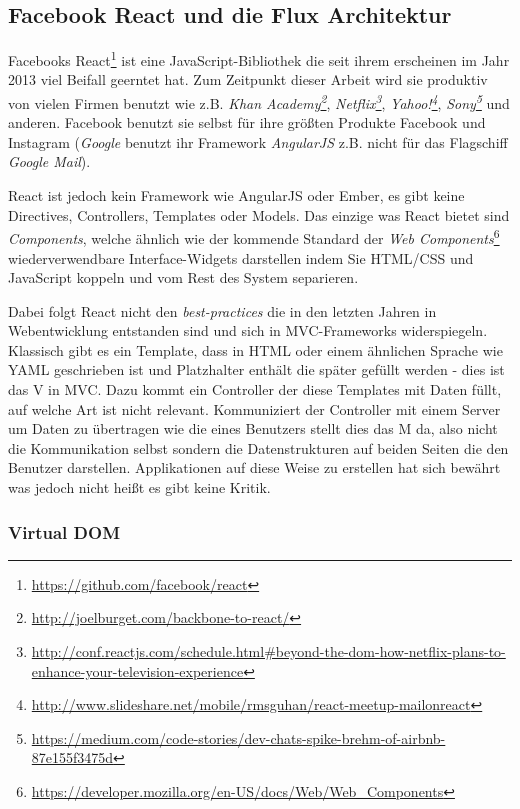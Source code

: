 \documentclass[12pt,twoside]{book}
\begin{document}
\subsection{Facebook React und die Flux Architektur}

Facebooks React\footnote{\url{https://github.com/facebook/react}} ist eine JavaScript-Bibliothek die seit ihrem erscheinen im Jahr 2013 viel Beifall geerntet hat. Zum Zeitpunkt dieser Arbeit wird sie produktiv von vielen Firmen benutzt wie z.B. \textit{Khan Academy\footnote{\url{http://joelburget.com/backbone-to-react/}}}, \textit{Netflix\footnote{\url{http://conf.reactjs.com/schedule.html\#beyond-the-dom-how-netflix-plans-to-enhance-your-television-experience}}}, \textit{Yahoo!\footnote{\url{http://www.slideshare.net/mobile/rmsguhan/react-meetup-mailonreact}}}, \textit{Sony\footnote{\url{https://medium.com/code-stories/dev-chats-spike-brehm-of-airbnb-87e155f3475d}}} und anderen. Facebook benutzt sie selbst für ihre größten Produkte Facebook und Instagram (\textit{Google} benutzt ihr Framework \textit{AngularJS} z.B. nicht für das Flagschiff \textit{Google Mail}).

React ist jedoch kein Framework wie AngularJS oder Ember, es gibt keine Directives, Controllers, Templates oder Models. Das einzige was React bietet sind \textit{Components}, welche ähnlich wie der kommende Standard der \textit{Web Components}\footnote{\url{https://developer.mozilla.org/en-US/docs/Web/Web_Components}} wiederverwendbare Interface-Widgets darstellen indem Sie HTML/CSS und JavaScript koppeln und vom Rest des System separieren.

Dabei folgt React nicht den \textit{best-practices} die in den letzten Jahren in Webentwicklung entstanden sind und sich in MVC-Frameworks widerspiegeln. Klassisch gibt es ein Template, dass in HTML oder einem ähnlichen Sprache wie YAML geschrieben ist und Platzhalter enthält die später gefüllt werden - dies ist das V in MVC.
Dazu kommt ein Controller der diese Templates mit Daten füllt, auf welche Art ist nicht relevant. Kommuniziert der Controller mit einem Server um Daten zu übertragen wie die eines Benutzers stellt dies das M da, also nicht die Kommunikation selbst sondern die Datenstrukturen auf beiden Seiten die den Benutzer darstellen.
Applikationen auf diese Weise zu erstellen hat sich bewährt was jedoch nicht heißt es gibt keine Kritik.

\subsubsection{Virtual DOM}
\end{document}
